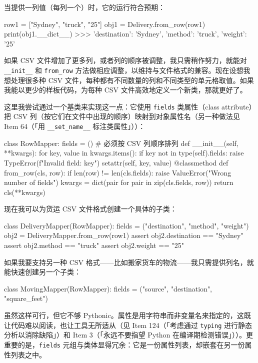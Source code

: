 当提供一列值（每列一个）时，它的运行符合预期：

\begin{codebox}[python]
row1 = ["Sydney", "truck", "25"]
obj1 = Delivery.from_row(row1)
print(obj1.__dict__)
>>>
{'destination': 'Sydney', 'method': 'truck', 'weight': '25'}
\end{codebox}

如果 CSV 文件增加了更多列，或者列的顺序被调整，我只需稍作努力，就能对 \texttt{\_\_init\_\_} 和 \texttt{from\_row} 方法做相应调整，以维持与文件格式的兼容。现在设想我想处理很多种 CSV 文件，每种都有不同数量的列和不同类型的单元格取值。如果我能以更少的样板代码，为每种 CSV 文件高效地定义一个新类，那就更好了。

这里我尝试通过一个基类来实现这一点：它使用 \texttt{fields} 类属性（class attribute）把 CSV 列（按它们在文件中出现的顺序）映射到对象属性名（另一种做法见 Item 64（「用 \texttt{\_\_set\_name\_\_} 标注类属性」））：

\begin{codebox}[python]
class RowMapper:
    fields = ()  # 必须按 CSV 列顺序排列
    def __init__(self, **kwargs):
        for key, value in kwargs.items():
            if key not in type(self).fields:
                raise TypeError(f"Invalid field: {key}")
            setattr(self, key, value)
    @classmethod
    def from_row(cls, row):
        if len(row) != len(cls.fields):
            raise ValueError("Wrong number of fields")
        kwargs = dict(pair for pair in zip(cls.fields, row))
        return cls(**kwargs)
\end{codebox}

现在我可以为货运 CSV 文件格式创建一个具体的子类：

\begin{codebox}[python]
class DeliveryMapper(RowMapper):
    fields = ("destination", "method", "weight")
obj2 = DeliveryMapper.from_row(row1)
assert obj2.destination == "Sydney"
assert obj2.method == "truck"
assert obj2.weight == "25"
\end{codebox}

如果我要支持另一种 CSV 格式——比如搬家货车的物流——我只需提供列名，就能快速创建另一个子类：

\begin{codebox}[python]
class MovingMapper(RowMapper):
    fields = ("source", "destination", "square_feet")
\end{codebox}

虽然这样可行，但它不够 Pythonic。属性是用字符串而非变量名来指定的，这既让代码难以阅读，也让工具无所适从（见 Item 124（「考虑通过 \texttt{typing} 进行静态分析以消除缺陷」）和 Item 3（「永远不要指望 Python 在编译期检测错误」））。更重要的是，\texttt{fields} 元组与类体显得冗余：它是一份属性列表，却嵌套在另一份属性列表之中。

